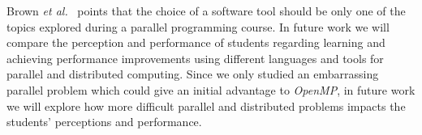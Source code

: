 Brown \textit{et al.}~\cite{Brown:2010:SPC:1971681.1971689} points that the
choice of a software tool should be only one of the topics explored during a
parallel programming course.  In future work we will compare the perception and
performance of students regarding learning and achieving performance
improvements using different languages and tools for parallel and distributed
computing.  Since we only studied an embarrassing parallel problem which could
give an initial advantage to \textit{OpenMP}, in future work we will explore
how more difficult parallel and distributed problems impacts the students'
perceptions and performance.
